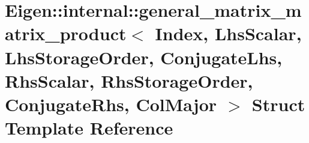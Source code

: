 \hypertarget{struct_eigen_1_1internal_1_1general__matrix__matrix__product_3_01_index_00_01_lhs_scalar_00_01_lc92e3fc5d91273c14187477f2d000bbe}{}\section{Eigen\+:\+:internal\+:\+:general\+\_\+matrix\+\_\+matrix\+\_\+product$<$ Index, Lhs\+Scalar, Lhs\+Storage\+Order, Conjugate\+Lhs, Rhs\+Scalar, Rhs\+Storage\+Order, Conjugate\+Rhs, Col\+Major $>$ Struct Template Reference}
\label{struct_eigen_1_1internal_1_1general__matrix__matrix__product_3_01_index_00_01_lhs_scalar_00_01_lc92e3fc5d91273c14187477f2d000bbe}
